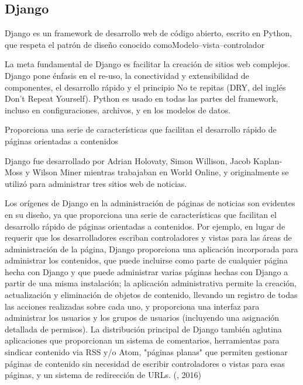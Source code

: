 \subsection{Django}
\setlength{\parskip}{5mm}
Django es un framework de desarrollo web de código abierto, escrito en Python, que respeta el patrón de diseño conocido comoModelo–vista–controlador

La meta fundamental de Django es facilitar la creación de sitios web complejos. Django pone énfasis en el re-uso, la conectividad y extensibilidad de componentes, el desarrollo rápido y el principio No te repitas (DRY, del inglés Don't Repeat Yourself). Python es usado en todas las partes del framework, incluso en configuraciones, archivos, y en los modelos de datos.

Proporciona una serie de características que facilitan el desarrollo rápido de páginas orientadas a contenidos

Django fue desarrollado por Adrian Holovaty, Simon Willison, Jacob Kaplan-Moss y Wilson Miner mientras trabajaban en World Online, y originalmente se utilizó para administrar tres sitios web de noticias.

Los orígenes de Django en la administración de páginas de noticias son evidentes en su diseño, ya que proporciona una serie de características que facilitan el desarrollo rápido de páginas orientadas a contenidos. Por ejemplo, en lugar de requerir que los desarrolladores escriban controladores y vistas para las áreas de administración de la página, Django proporciona una aplicación incorporada para administrar los contenidos, que puede incluirse como parte de cualquier página hecha con Django y que puede administrar varias páginas hechas con Django a partir de una misma instalación; la aplicación administrativa permite la creación, actualización y eliminación de objetos de contenido, llevando un registro de todas las acciones realizadas sobre cada uno, y proporciona una interfaz para administrar los usuarios y los grupos de usuarios (incluyendo una asignación detallada de permisos).
La distribución principal de Django también aglutina aplicaciones que proporcionan un sistema de comentarios, herramientas para sindicar contenido via RSS y/o Atom, "páginas planas" que permiten gestionar páginas de contenido sin necesidad de escribir controladores o vistas para esas páginas, y un sistema de redirección de URLs. (\citet{djangobib}, 2016) 

